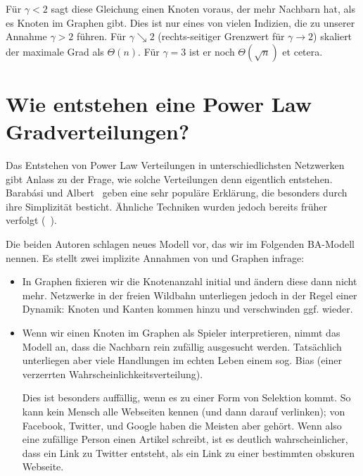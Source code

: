 Für $\gamma  < 2$ sagt diese Gleichung einen Knoten voraus, der mehr Nachbarn hat, als es Knoten im Graphen gibt.
Dies ist nur eines von vielen Indizien, die zu unserer Annahme $\gamma > 2$ führen.
Für $\gamma \searrow 2$ (\dh rechts-seitiger Grenzwert für $\gamma \to 2$) skaliert der maximale Grad als $\Theta(n)$.
Für $\gamma = 3$ ist er noch $\Theta(\sqrt{n})$ et cetera.

\section{Wie entstehen eine Power Law Gradverteilungen?}
Das Entstehen von Power Law Verteilungen in  unterschiedlichsten Netzwerken gibt Anlass zu der Frage, wie solche Verteilungen denn eigentlich entstehen.
Barab{\'{a}}si und Albert~\cite{barabasi1999emergence} geben eine sehr populäre Erklärung, die besonders durch ihre Simplizität besticht.
Ähnliche Techniken wurden jedoch bereits früher verfolgt (\zB~\cite{10.2307/1716232}).

Die beiden Autoren schlagen neues Modell vor, das wir im Folgenden BA-Modell nennen.
Es stellt zwei implizite Annahmen von \Gnp und \Gnm Graphen infrage:
\begin{itemize}
    \item
          In \Gnp Graphen fixieren wir die Knotenanzahl initial und ändern diese dann nicht mehr.
          Netzwerke in der freien Wildbahn unterliegen jedoch in der Regel einer Dynamik:
          Knoten und Kanten kommen hinzu und verschwinden ggf. wieder.

    \item
          Wenn wir einen Knoten im \Gnp Graphen als Spieler interpretieren, nimmt das Modell an, dass die Nachbarn rein zufällig ausgesucht werden.
          Tatsächlich unterliegen aber viele Handlungen im echten Leben einem sog. Bias (\dh einer verzerrten Wahrscheinlichkeitsverteilung).

          Dies ist besonders auffällig, wenn es zu einer Form von Selektion kommt.
          So kann kein Mensch alle Webseiten kennen (und dann darauf verlinken); von Facebook, Twitter, und Google haben die Meisten aber gehört.
          Wenn also eine zufällige Person einen Artikel schreibt, ist es deutlich wahrscheinlicher, dass ein Link zu Twitter entsteht, als ein Link zu einer bestimmten obskuren Webseite.
\end{itemize}

